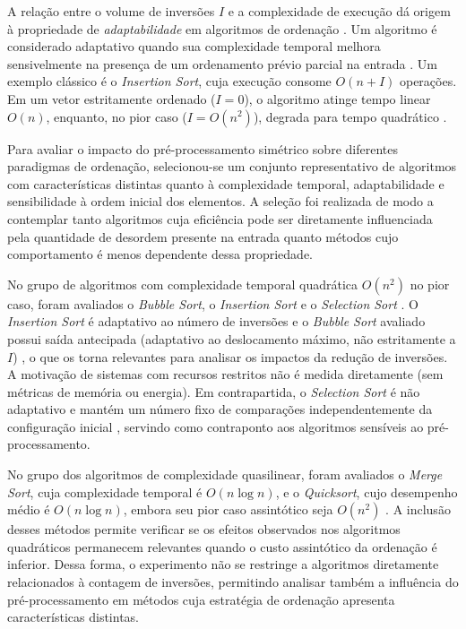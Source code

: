 \documentclass[portuguese]{sbc2025}%
\begin{document}
A relação entre o volume de inversões $I$ e a complexidade de execução dá origem à propriedade de \emph{adaptabilidade} em algoritmos de ordenação \citep{estivill-castro_survey_1992}. Um algoritmo é considerado adaptativo quando sua complexidade temporal melhora sensivelmente na presença de um ordenamento prévio parcial na entrada \citep{mannila_measures_1984}. Um exemplo clássico é o \emph{Insertion Sort}, cuja execução consome $O(n + I)$ operações. Em um vetor estritamente ordenado ($I = 0$), o algoritmo atinge tempo linear $O(n)$, enquanto, no pior caso ($I = O(n^2)$), degrada para tempo quadrático \citep{cormen_introduction_2022, knuth_art_1973}.

Para avaliar o impacto do pré-processamento simétrico sobre diferentes paradigmas de ordenação, selecionou-se um conjunto representativo de algoritmos com características distintas quanto à complexidade temporal, adaptabilidade e sensibilidade à ordem inicial dos elementos. A seleção foi realizada de modo a contemplar tanto algoritmos cuja eficiência pode ser diretamente influenciada pela quantidade de desordem presente na entrada quanto métodos cujo comportamento é menos dependente dessa propriedade.

No grupo de algoritmos com complexidade temporal quadrática $O(n^2)$ no pior caso, foram avaliados o \emph{Bubble Sort}, o \emph{Insertion Sort} e o \emph{Selection Sort} \citep{cormen_introduction_2022}. O \emph{Insertion Sort} é adaptativo ao número de inversões e o \emph{Bubble Sort} avaliado possui saída antecipada (adaptativo ao deslocamento máximo, não estritamente a $I$) \citep{estivill-castro_survey_1992}, o que os torna relevantes para analisar os impactos da redução de inversões. A motivação de sistemas com recursos restritos não é medida diretamente (sem métricas de memória ou energia). Em contrapartida, o \emph{Selection Sort} é não adaptativo e mantém um número fixo de comparações independentemente da configuração inicial \citep{estivill-castro_survey_1992}, servindo como contraponto aos algoritmos sensíveis ao pré-processamento.

No grupo dos algoritmos de complexidade quasilinear, foram avaliados o \emph{Merge Sort}, cuja complexidade temporal é $O(n\log n)$, e o \emph{Quicksort}, cujo desempenho médio é $O(n\log n)$, embora seu pior caso assintótico seja $O(n^2)$ \citep{cormen_introduction_2022}. A inclusão desses métodos permite verificar se os efeitos observados nos algoritmos quadráticos permanecem relevantes quando o custo assintótico da ordenação é inferior. Dessa forma, o experimento não se restringe a algoritmos diretamente relacionados à contagem de inversões, permitindo analisar também a influência do pré-processamento em métodos cuja estratégia de ordenação apresenta características distintas.
\end{document}
